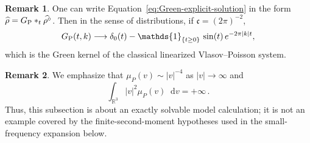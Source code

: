 \documentclass[a4paper,12pt]{amsart} %
\theoremstyle{plain}
\theoremstyle{definition}
\newtheorem{remark}{Remark}[section]
\newcommand		{\RR}		{\mathbb R}			%
\newcommand		{\R}		{\RR}
\newcommand		{\Rd}		{\R^3}
\newcommand		{\lt}			{\left}				%
\newcommand		{\rt}			{\right}			%
\renewcommand	{\(}			{\lt(}
\renewcommand	{\)}			{\rt)}
\newcommand		{\n}[1]			{\lt\lvert{#1}\rt\rvert}	%
\newcommand		{\indic}	{\mathds{1}}		%
\renewcommand		{\d}		{\mathop{}\!\mathrm{d}}		%
\newcommand		{\intd}			{\int_{\Rd}}
\newcommand		{\CK}			{\mathfrak{c}}	%
\begin{document}
	\begin{remark}
		One can write Equation~\eqref{eq:Green-explicit-solution} in the form $\widehat\rho = G_\textnormal{P} *_t \widehat{\rho^\circ}$. Then in the sense of distributions, if $\CK=(2\pi)^{-2}$,
		\begin{equation}\label{Green-classical-limit}
			G_\textnormal{P}(t,k) \longrightarrow
			\delta_0(t)- \indic_{\{t\ge0\}} \, \sin(t) \, e^{-2\pi \n{k}t} ,
		\end{equation}
		which is the Green kernel of the classical linearized Vlasov--Poisson system.
	\end{remark}

	\begin{remark}
		We emphasize that $\mu_P(v)\sim |v|^{-4}$ as $|v|\to\infty$ and
		\begin{equation*}
			\intd \n{v}^2 \mu_P(v) \d v = +\infty \, .
		\end{equation*}
		Thus, this subsection is about an exactly solvable model calculation; it is not an example covered by the finite-second-moment hypotheses used in the small-frequency expansion below.
	\end{remark}
	
\end{document}
